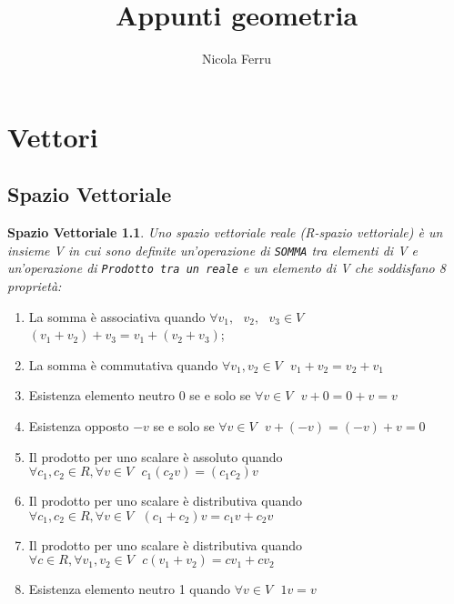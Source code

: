 \documentclass{book}
\title{Appunti geometria}
\author{Nicola Ferru}
\begin{document}
\maketitle
\tableofcontents
\listoftables
\listoffigures


\chapter{Vettori}
\section{Spazio Vettoriale}
\newtheorem{SpaVet}{Spazio Vettoriale}
\begin{SpaVet}
	Uno spazio vettoriale reale (R-spazio vettoriale) è un insieme \textit{V} in
	cui sono definite un'operazione di \texttt{SOMMA} tra elementi di
	\textit{V} e un'operazione di \texttt{Prodotto tra un reale} e un elemento
	di V che soddisfano 8 proprietà:
\end{SpaVet}
\begin{enumerate}
	\item La somma è associativa quando $\forall v_1, \text{ } v_2, \text{ } v_3 
		\in V$ $\left(v_1+v_2\right)+v_3=v_1+\left(v_2+v_3\right)$;
	\item La somma è commutativa quando $\forall v_1, v_2 \in V\text{ }
		v_1+v_2=v_2+v_1$
	\item Esistenza elemento neutro 0 se e solo se $\forall v\in V \text{ }
		v+0=0+v=v$
	\item Esistenza opposto $-v$ se e solo se $\forall v \in V \text{ }
		v+(-v)=(-v)+v=0$
	\item Il prodotto per uno scalare è assoluto quando $\forall c_1,c_2 \in
		R, \forall v\in V \text{ } c_1(c_2v)=(c_1c_2)v$
	\item Il prodotto per uno scalare è distributiva quando $\forall c_1,c_2 \in
		R, \forall v\in V \text{ } (c_1+c_2)v=c_1v+c_2v$
	\item Il prodotto per uno scalare è distributiva quando $\forall c \in
		R, \forall v_1, v_2\in V \text{ }c(v_1+v_2)=cv_1+cv_2$
	\item Esistenza elemento neutro 1 quando $\forall v\in V \text{ } 1v=v$
\end{enumerate}
\end{document}
